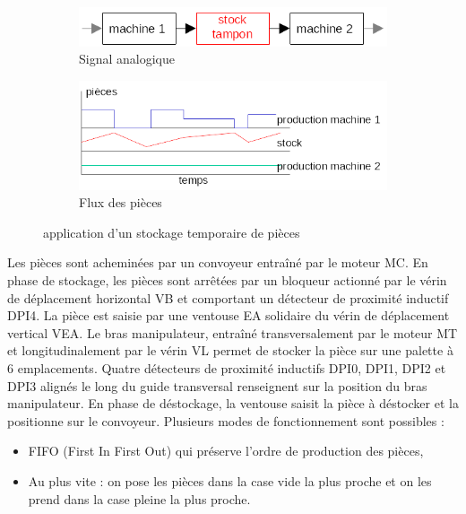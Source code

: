 \documentclass[11pt, multicol]{article}
\begin{document}
\begin{figure}
	\begin{subfigure}{0.49\textwidth}
	\centering
		\includegraphics[width=\textwidth]{images/fluxPiece}
		\caption{Signal analogique}
	\end{subfigure}%
	\begin{subfigure}{.49\textwidth}
		\includegraphics[width=\textwidth]{images/graphPiece}
		\caption{Flux des pièces}
	\end{subfigure}
	\caption{application d'un stockage temporaire de pièces}
	\label{fig:application}
\end{figure}

Les pièces sont acheminées par un convoyeur entraîné par le moteur MC.
En phase de stockage, les pièces sont arrêtées par un bloqueur actionné par le vérin de déplacement horizontal VB et comportant un détecteur de proximité inductif DPI4.
La pièce est saisie par une ventouse EA solidaire du vérin de déplacement vertical VEA.
Le bras manipulateur, entraîné transversalement par le moteur MT et longitudinalement par le
vérin VL permet de stocker la pièce sur une palette à 6 emplacements. Quatre détecteurs de
proximité inductifs DPI0, DPI1, DPI2 et DPI3 alignés le long du guide transversal renseignent sur
la position du bras manipulateur.
En phase de déstockage, la ventouse saisit la pièce à déstocker et la positionne sur le
convoyeur.
Plusieurs modes de fonctionnement sont possibles :
\begin{itemize}
	\item FIFO (First In First Out) qui préserve l’ordre de production des pièces,
	\item  Au plus vite : on pose les pièces dans la case vide la plus proche et on les prend dans la case
	pleine la plus proche.
\end{itemize}
\end{document}
